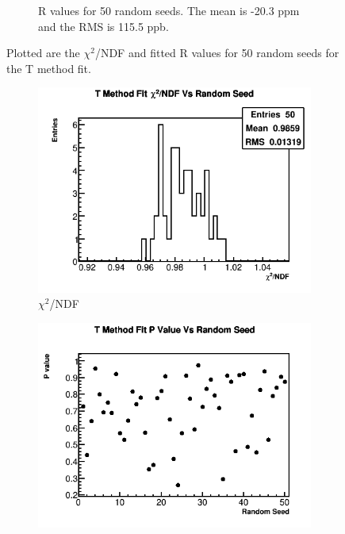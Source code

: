 \begin{figure}[]
\begin{subfigure}[t]{0.45\textwidth}
		    \caption{R values for 50 random seeds. The mean is -20.3 ppm and the RMS is 115.5 ppb.}
		\label{Subfig:RVsRandomSeedTMethod}
	    \end{subfigure}%
	\caption[RandomSeedsTMethod]{Plotted are the $\chi^{2}$/NDF and fitted R values for 50 random seeds for the T method fit.}
	\label{fig:RandomSeedsTMethod}
	\end{figure}

	\begin{figure}[]
	\centering
	    \begin{subfigure}[t]{0.45\textwidth}
		    \centering
			\includegraphics[width=\textwidth]{TMethod_Chi2NDF_Vs_Iter_Canv_hist}
		    \caption{$\chi^{2}$/NDF}
	    \end{subfigure}
	    \hspace{4mm}
	    \begin{subfigure}[t]{0.45\textwidth}
		    \centering
			\includegraphics[width=\textwidth]{TMethod_PVal_Vs_Iter_Canv}

\end{subfigure}
\end{figure}
